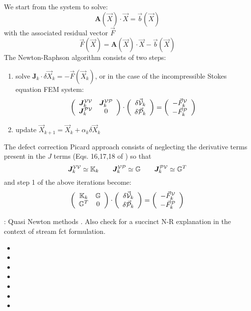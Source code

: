 We start from the system to solve:
\[
{\bm A}(\vec X) \cdot \vec X = \vec b(\vec X)
\]
with the associated residual vector $\vec F$ 
\[
\vec F(\vec X) = {\bm A}(\vec X) \cdot \vec X - \vec b(\vec X)
\]
The Newton-Raphson algorithm consists of two steps:
\begin{enumerate}
\item solve $\bm J_k \cdot \delta \vec X_k = -\vec F(\vec X_k)$, or in the 
case of the incompressible Stokes equation FEM system:
\[
\left(
\begin{array}{cc}
\bm J^{{\cal V}{\cal V}}_k & \bm J^{{\cal V}{\cal P}}_k \\
\bm J^{{\cal P}{\cal V}}_k & 0
\end{array}
\right)
\cdot
\left(
\begin{array}{c}
\delta \vec {\cal V}_k \\ \delta \vec {\cal P}_k
\end{array}
\right)
=
\left(
\begin{array}{c}
- \vec F_k^{\cal V} \\ -\vec F_k^{\cal P}
\end{array}
\right)
\]

\item update $\vec X_{k+1} = \vec X_k + \alpha_k \delta \vec X_k$
\end{enumerate}
The defect correction Picard approach consists of neglecting the derivative terms present 
in the $J$ terms (Eqs. 16,17,18 of \cite{frbt19}) so that 
\[
\bm J^{{\cal V}{\cal V}}_k \simeq {\mathbb{K}}_k 
\quad\quad
\bm J^{{\cal V}{\cal P}}_k \simeq {\mathbb{G}} 
\quad\quad
\bm J^{{\cal P}{\cal V}}_k \simeq {\mathbb{G}}^T
\]
and step 1 of the above iterations become:
\[
\left(
\begin{array}{cc}
{\mathbb{K}}_k & {\mathbb{G}} \\ {\mathbb{G}}^T & 0
\end{array}
\right)
\cdot
\left(
\begin{array}{c}
\delta \vec {\cal V}_k \\ \delta \vec {\cal P}_k
\end{array}
\right)
=
\left(
\begin{array}{c}
- \vec F_k^{\cal V} \\ -\vec F_k^{\cal P}
\end{array}
\right)
\]

\vspace{1cm}


\Literature: Quasi Newton methods \cite{ensb81}.
Also check \textcite{chyu89} for a succinct N-R explanation 
in the context of stream fct formulation.
\begin{itemize}
\item {}
\item {}
\item {}
\item {}
\item {}
\item {}
\item {}
\end{itemize}


